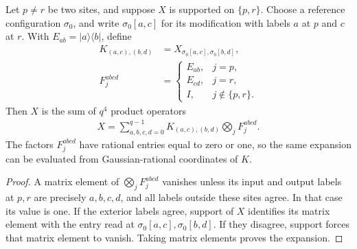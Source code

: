 \begin{lemma}
    \label{lem:lvv_two_site_product_expansion}
    \leanok
    Let $p\ne r$ be two sites, and suppose $X$ is supported on
    $\{p,r\}$. Choose a reference configuration $\sigma_0$, and write
    $\sigma_0[a,c]$ for its modification with labels $a$ at $p$ and
    $c$ at $r$. With $E_{ab}=|a\rangle\langle b|$, define
    \begin{align*}
        K_{(a,c),(b,d)} & =X_{\sigma_0[a,c],\sigma_0[b,d]}, \\
        F_j^{abcd}      & =\begin{cases}
                               E_{ab}, & j=p,            \\
                               E_{cd}, & j=r,            \\
                               I,      & j\notin\{p,r\}.
                           \end{cases}
    \end{align*}
    Then $X$ is the sum of $q^4$ product operators
    \begin{align*}
        X=\sum_{a,b,c,d=0}^{q-1}
        K_{(a,c),(b,d)}\bigotimes_j F_j^{abcd}.
    \end{align*}
    The factors $F_j^{abcd}$ have rational entries equal to zero or one,
    so the same expansion can be evaluated from Gaussian-rational
    coordinates of $K$.
\end{lemma}
\begin{proof}\leanok
    A matrix element of $\bigotimes_jF_j^{abcd}$ vanishes unless its
    input and output labels at $p,r$ are precisely $a,b,c,d$, and all
    labels outside these sites agree. In that case its value is one.
    If the exterior labels agree, support of $X$ identifies its matrix
    element with the entry read at $\sigma_0[a,c],\sigma_0[b,d]$.
    If they disagree, support forces that matrix element to vanish.
    Taking matrix elements proves the expansion.
\end{proof}

